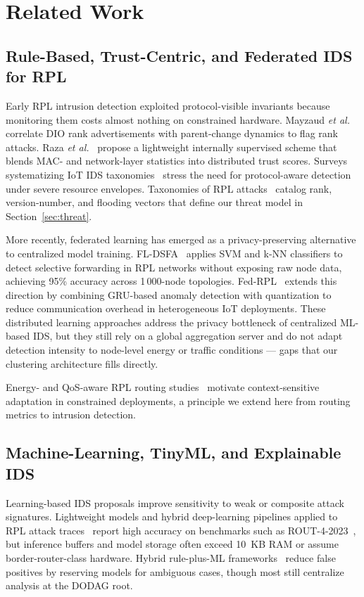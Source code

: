 \section{Related Work}
\label{sec:related}

\subsection{Rule-Based, Trust-Centric, and Federated IDS for RPL}
Early RPL intrusion detection exploited protocol-visible invariants because monitoring them costs almost nothing on constrained hardware.
Mayzaud \textit{et al.}~\cite{mayzaud2016} correlate DIO rank advertisements with parent-change dynamics to flag rank attacks.
Raza \textit{et al.}~\cite{raza2017} propose a lightweight internally supervised scheme that blends MAC- and network-layer statistics into distributed trust scores.
Surveys systematizing IoT IDS taxonomies~\cite{sfar2018,granjal2015rplsec,yan2014iotsec,sicari2015security} stress the need for protocol-aware detection under severe resource envelopes.
Taxonomies of RPL attacks~\cite{raza2020rplids,anton2024rpl} catalog rank, version-number, and flooding vectors that define our threat model in Section~\ref{sec:threat}.

More recently, federated learning has emerged as a privacy-preserving alternative to centralized model training.
FL-DSFA~\cite{fldsfa2024} applies SVM and k-NN classifiers to detect selective forwarding in RPL networks without exposing raw node data, achieving 95\% accuracy across 1\,000-node topologies.
Fed-RPL~\cite{fedrpl2024} extends this direction by combining GRU-based anomaly detection with quantization to reduce communication overhead in heterogeneous IoT deployments.
These distributed learning approaches address the privacy bottleneck of centralized ML-based IDS, but they still rely on a global aggregation server and do not adapt detection intensity to node-level energy or traffic conditions --- gaps that our clustering architecture fills directly.

Energy- and QoS-aware RPL routing studies~\cite{belacel2025rplmqos,belacel2025rplaer} motivate context-sensitive adaptation in constrained deployments, a principle we extend here from routing metrics to intrusion detection.

\subsection{Machine-Learning, TinyML, and Explainable IDS}
Learning-based IDS proposals improve sensitivity to weak or composite attack signatures.
Lightweight models and hybrid deep-learning pipelines applied to RPL attack traces~\cite{hindy2020,hamdi2024,shahid2024hybrid} report high accuracy on benchmarks such as ROUT-4-2023~\cite{emec2023rout4}, but inference buffers and model storage often exceed 10~KB RAM or assume border-router-class hardware.
Hybrid rule-plus-ML frameworks~\cite{garg2023} reduce false positives by reserving models for ambiguous cases, though most still centralize analysis at the DODAG root.

